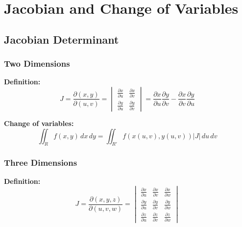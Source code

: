 \documentclass[11pt,a4paper]{article}
\begin{document}
\newpage
\section{Jacobian and Change of Variables}

\subsection{Jacobian Determinant}

\subsubsection{Two Dimensions}

\textbf{Definition:}
\begin{equation}
\boxed{J = \frac{\partial(x, y)}{\partial(u, v)} = \begin{vmatrix}
\frac{\partial x}{\partial u} & \frac{\partial x}{\partial v} \\[6pt]
\frac{\partial y}{\partial u} & \frac{\partial y}{\partial v}
\end{vmatrix} = \frac{\partial x}{\partial u}\frac{\partial y}{\partial v} - \frac{\partial x}{\partial v}\frac{\partial y}{\partial u}}
\tag{J.1}
\end{equation}

\textbf{Change of variables:}
\begin{equation}
\boxed{\iint_R f(x, y)\, dx\, dy = \iint_{R'} f(x(u,v), y(u,v))\left|J\right|\, du\, dv}
\tag{J.2}
\end{equation}

\subsubsection{Three Dimensions}

\textbf{Definition:}
\begin{equation}
\boxed{J = \frac{\partial(x, y, z)}{\partial(u, v, w)} = \begin{vmatrix}
\frac{\partial x}{\partial u} & \frac{\partial x}{\partial v} & \frac{\partial x}{\partial w} \\[6pt]
\frac{\partial y}{\partial u} & \frac{\partial y}{\partial v} & \frac{\partial y}{\partial w} \\[6pt]
\frac{\partial z}{\partial u} & \frac{\partial z}{\partial v} & \frac{\partial z}{\partial w}
\end{vmatrix}}
\tag{J.3}
\end{equation}
\end{document}
